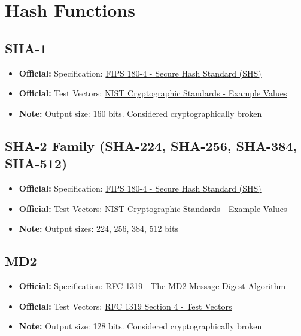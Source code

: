 \documentclass[12pt,a4paper]{article}
\newcommand{\official}[1]{\textcolor{citegreen}{\textbf{Official:}} #1}
\newcommand{\note}[1]{\textcolor{noteorange}{\textbf{Note:}} #1}
\newcommand{\link}[2]{\href{#1}{#2}}
\begin{document}
\newpage

\section{Hash Functions}

\subsection{SHA-1}
\begin{itemize}
    \item \official{Specification:} \link{https://nvlpubs.nist.gov/nistpubs/FIPS/NIST.FIPS.180-4.pdf}{FIPS 180-4 - Secure Hash Standard (SHS)}
    \item \official{Test Vectors:} \link{https://csrc.nist.gov/Projects/cryptographic-standards-and-guidelines/example-values}{NIST Cryptographic Standards - Example Values}
    \item \note{Output size: 160 bits. Considered cryptographically broken}
\end{itemize}

\subsection{SHA-2 Family (SHA-224, SHA-256, SHA-384, SHA-512)}
\begin{itemize}
    \item \official{Specification:} \link{https://nvlpubs.nist.gov/nistpubs/FIPS/NIST.FIPS.180-4.pdf}{FIPS 180-4 - Secure Hash Standard (SHS)}
    \item \official{Test Vectors:} \link{https://csrc.nist.gov/Projects/cryptographic-standards-and-guidelines/example-values}{NIST Cryptographic Standards - Example Values}
    \item \note{Output sizes: 224, 256, 384, 512 bits}
\end{itemize}

\subsection{MD2}
\begin{itemize}
    \item \official{Specification:} \link{https://tools.ietf.org/html/rfc1319}{RFC 1319 - The MD2 Message-Digest Algorithm}
    \item \official{Test Vectors:} \link{https://tools.ietf.org/html/rfc1319#section-4}{RFC 1319 Section 4 - Test Vectors}
    \item \note{Output size: 128 bits. Considered cryptographically broken}
\end{itemize}
\end{document}
